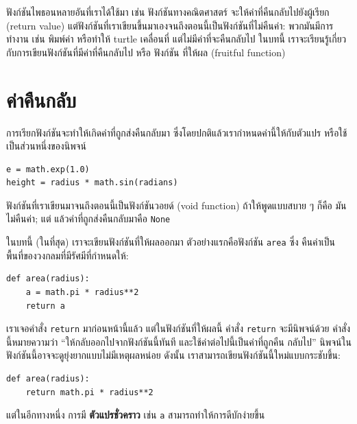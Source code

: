 ฟังก์ชันไพธอนหลายอันที่เราได้ใช้มา เช่น ฟังก์ชันทางคณิตศาสตร์ 
จะให้ค่าที่คืนกลับไปยังผู้เรียก (return value)  แต่ฟังก์ชันที่เราเขียนขึ้นมาเองจนถึงตอนนี้เป็นฟังก์ชันที่ไม่คืนค่า:
พวกมันมีการทำงาน เช่น พิมพ์ค่า หรือทำให้ turtle เคลื่อนที่ 
แต่ไม่มีค่าที่จะคืนกลับไป ในบทนี้ เราจะเรียนรู้เกี่ยวกับการเขียนฟังก์ชันที่มีค่าที่คืนกลับไป หรือ ฟังก์ชัน
ที่ให้ผล (fruitful function)

\section{ค่าคืนกลับ} %

การเรียกฟังก์ชันจะทำให้เกิดค่าที่ถูกส่งคืนกลับมา ซึ่งโดยปกติแล้วเรากำหนดค่านี้ให้กับตัวแปร
หรือใช้เป็นส่วนหนึ่งของนิพจน์

\begin{verbatim}
e = math.exp(1.0)
height = radius * math.sin(radians)
\end{verbatim}
%
ฟังก์ชันที่เราเขียนมาจนถึงตอนนี้เป็นฟังก์ชันวอยด์ (void function) ถ้าให้พูดแบบสบาย ๆ ก็คือ มันไม่คืนค่า;
แต่ แล้วค่าที่ถูกส่งคืนกลับมาคือ {\tt None}

ในบทนี้ (ในที่สุด) เราจะเขียนฟังก์ชันที่ให้ผลออกมา ตัวอย่างแรกคือฟังก์ชัน {\tt area} ซึ่ง
คืนค่าเป็นพื้นที่ของวงกลมที่มีรัศมีที่กำหนดให้:


\begin{verbatim}
def area(radius):
    a = math.pi * radius**2
    return a
\end{verbatim}
%
เราเจอคำสั่ง {\tt return} มาก่อนหน้านี้แล้ว แต่ในฟังก์ชันที่ให้ผลนี้ คำสั่ง {\tt return} จะมีนิพจน์ด้วย คำสั่งนี้หมายความว่า ``ให้กลับออกไปจากฟังก์ชันนี้ทันที และใช้ค่าต่อไปนี้เป็นค่าที่ถูกคืน
กลับไป'' นิพจน์ในฟังก์ชันนี้อาจจะดูยุ่งยากแบบไม่มีเหตุผลหน่อย ดังนั้น เราสามารถเขียนฟังก์ชันนี้ใหม่แบบกระชับขึ้น:

\begin{verbatim}
def area(radius):
    return math.pi * radius**2
\end{verbatim}
%
แต่ในอีกทางหนึ่ง การมี {\bf ตัวแปรชั่วคราว} เช่น {\tt a} สามารถทำให้การดีบักง่ายขึ้น 

